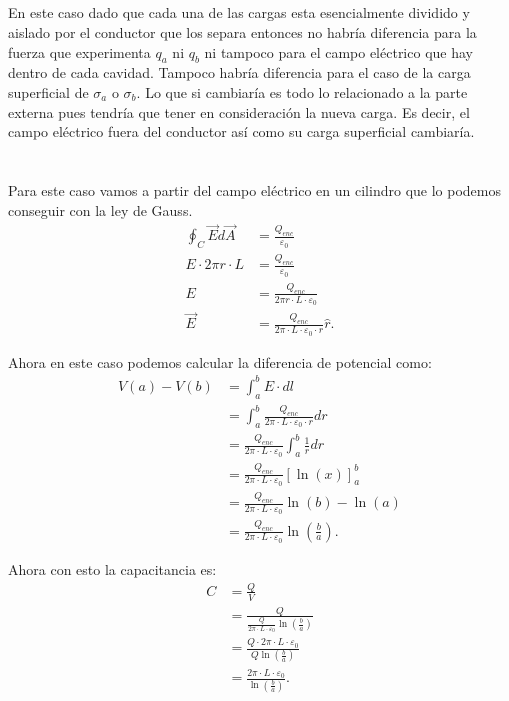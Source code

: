 \documentclass{report}
\begin{document}
\section{}

En este caso dado que cada una de las cargas esta esencialmente dividido y aislado por el conductor que los separa entonces no habría diferencia para la fuerza que experimenta $q_a$ ni $q_b$ ni tampoco para el campo eléctrico que hay dentro de cada cavidad. Tampoco habría diferencia para el caso de la carga superficial de $\sigma_a$ o $\sigma_b$. Lo que si cambiaría es todo lo relacionado a la parte externa pues tendría que tener en consideración la nueva carga. Es decir, el campo eléctrico fuera del conductor así como su carga superficial cambiaría.

\chapter{}

Para este caso vamos a partir del campo eléctrico en un cilindro que lo podemos conseguir con la ley de Gauss.
\begin{align*}
  \oint_{C} \vec{E} d\vec{A} &= \frac{Q_{enc}}{\varepsilon_0} \\
  E \cdot 2\pi r \cdot L &= \frac{Q_{enc}}{\varepsilon_0} \\
  E &= \frac{Q_{enc}}{2\pi r \cdot L \cdot \varepsilon_0} \\
  \vec{E} &= \frac{Q_{enc}}{2\pi\cdot L \cdot \varepsilon_0 \cdot r} \hat{r}
.\end{align*}

Ahora en este caso podemos calcular la diferencia de potencial como:
\begin{align*}
  V\left( a \right) - V\left( b \right) &= \int_{a}^{b} E\cdot dl \\
  &= \int_{a}^{b} \frac{Q_{enc}}{2\pi\cdot L \cdot \varepsilon_0 \cdot r} dr\\
  &= \frac{Q_{enc}}{2\pi\cdot L \cdot \varepsilon_0}\int_{a}^{b} \frac{1}{r} dr\\
  &= \frac{Q_{enc}}{2\pi\cdot L \cdot \varepsilon_0} \left[ \ln(x) \right]_{a}^{b}\\
  &= \frac{Q_{enc}}{2\pi\cdot L \cdot \varepsilon_0} \ln(b) - \ln(a)\\
  &= \frac{Q_{enc}}{2\pi\cdot L \cdot \varepsilon_0} \ln\left( \frac{b}{a} \right)
.\end{align*}

Ahora con esto la capacitancia es:
\begin{align*}
  C &= \frac{Q}{V} \\
  &= \frac{Q}{\frac{Q}{2\pi\cdot L \cdot \varepsilon_0} \ln\left( \frac{b}{a} \right)} \\
  &= \frac{Q \cdot 2\pi\cdot L \cdot \varepsilon_0}{Q \ln\left( \frac{b}{a} \right)} \\
  &= \frac{2\pi\cdot L \cdot \varepsilon_0}{\ln\left( \frac{b}{a} \right)}
.\end{align*}
\end{document}
